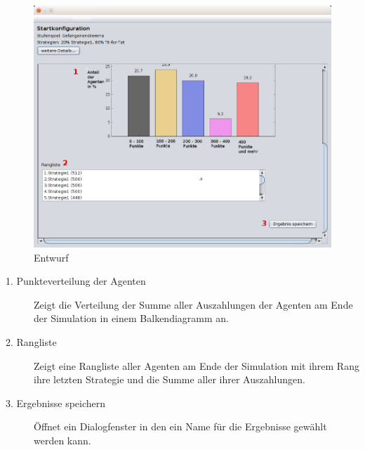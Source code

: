 \begin{figure}[hp] 
  \centering
     \includegraphics[width=1.2\textwidth]{GUI_Entwurf/Ergebnisfenster2.png}
  \caption{Entwurf}
  \label{fig:Bild1}
\end{figure}

\begin{description}

\item[1. Punkteverteilung der Agenten] Zeigt die Verteilung der Summe aller Auszahlungen der Agenten am Ende der Simulation in einem Balkendiagramm an.

\item[2. Rangliste] Zeigt eine Rangliste aller Agenten am Ende der Simulation mit ihrem Rang ihre letzten Strategie und die Summe aller ihrer Auszahlungen.

\item[3. Ergebnisse speichern] Öffnet ein Dialogfenster in den ein Name für die Ergebnisse gewählt werden kann.


\end{description}


